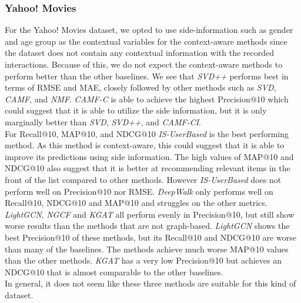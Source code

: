 \subsubsection{Yahoo! Movies}
For the Yahoo! Movies dataset, we opted to use side-information such as gender and age group as the contextual variables for the context-aware methods since the dataset does not contain any contextual information with the recorded interactions.
Because of this, we do not expect the context-aware methods to perform better than the other baselines.
We see that \textit{SVD++} performs best in terms of RMSE and MAE, closely followed by other methods such as \textit{SVD}, \textit{CAMF}, and \textit{NMF}.
\textit{CAMF-C} is able to achieve the highest Precision@10 which could suggest that it is able to utilize the side information, but it is only marginally better than \textit{SVD}, \textit{SVD++}, and \textit{CAMF-CI}.
\\
For Recall@10, MAP@10, and NDCG@10 \textit{IS-UserBased} is the best performing method.
As this method is context-aware, this could suggest that it is able to improve its predictions using side information.
The high values of MAP@10 and NDCG@10 also suggest that it is better at recommending relevant items in the front of the list compared to other methods.
However \textit{IS-UserBased} does not perform well on Precision@10 nor RMSE.
\textit{DeepWalk} only performs well on Recall@10, NDCG@10 and MAP@10 and struggles on the other metrics.
\\
\textit{LightGCN}, \textit{NGCF} and \textit{KGAT} all perform evenly in Precision@10, but still show worse results than the methods that are not graph-based.
\textit{LightGCN} shows the best Precision@10 of these methods, but its Recall@10 and NDCG@10 are worse than many of the baselines.
The methods achieve much worse MAP@10 values than the other methods.
\textit{KGAT} has a very low Precision@10 but achieves an NDCG@10 that is almost comparable to the other baselines.
\\
In general, it does not seem like these three methods are suitable for this kind of dataset.


